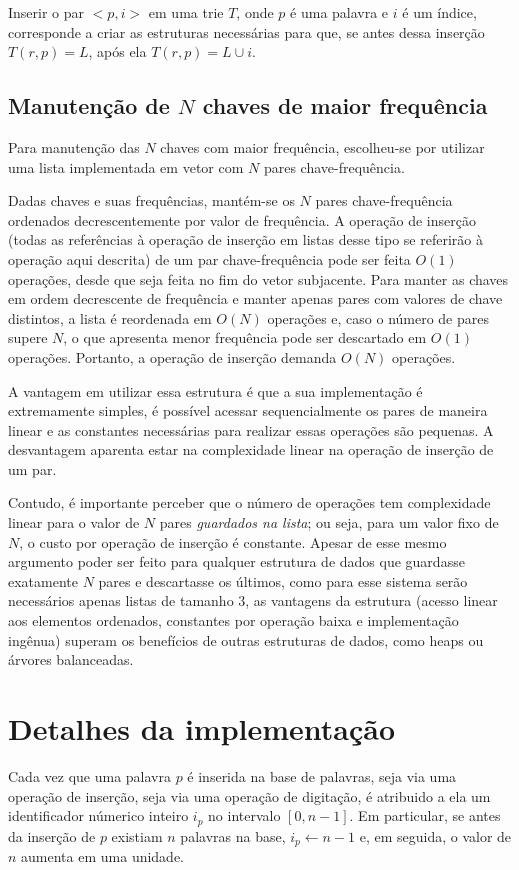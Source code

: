 \documentclass[12pt]{article}
\begin{document}
    Inserir o par $<p, i>$ em uma trie $T$, onde $p$ é uma palavra e $i$ é um índice, corresponde a criar as estruturas necessárias para que, se antes dessa inserção $T(r, p) = L$, após ela $T(r, p) = L \cup i$.

    \subsection{Manutenção de $N$ chaves de maior frequência} \label{sec:list}
    Para manutenção das $N$ chaves com maior frequência, escolheu-se por utilizar uma lista implementada em vetor com $N$ pares chave-frequência.

    Dadas chaves e suas fre\-quên\-cias, mantém-se os $N$ pares chave-frequência ordenados decrescentemente por valor de frequência.
    A operação de inserção (todas as referências à operação de inserção em listas desse tipo se referirão à operação aqui descrita) de um par chave-frequência pode ser feita $O(1)$ operações, desde que seja feita no fim do vetor subjacente.
    Para manter as chaves em ordem decrescente de frequência e manter apenas pares com valores de chave distintos, a lista é reordenada em $O(N)$ operações e, caso o número de pares supere $N$, o que apresenta menor frequência pode ser descartado em $O(1)$ operações.
    Portanto, a operação de inserção demanda $O(N)$ operações.

    A vantagem em utilizar essa estrutura é que a sua implementação é extremamente simples, é possível acessar sequencialmente os pares de maneira linear e as constantes necessárias para realizar essas operações são pequenas.
    A desvantagem aparenta estar na complexidade linear na operação de inserção de um par.

    Contudo, é importante perceber que o número de operações tem complexidade linear para o valor de $N$ pares \emph{guardados na lista}; ou seja, para um valor fixo de $N$, o custo por operação de inserção é constante.
    Apesar de esse mesmo argumento poder ser feito para qualquer estrutura de dados que guardasse exatamente $N$ pares e descartasse os últimos, como para esse sistema serão necessários apenas listas de tamanho 3, as vantagens da estrutura (acesso linear aos elementos ordenados, constantes por operação baixa e implementação ingênua) superam os benefícios de outras estruturas de dados, como heaps ou árvores balanceadas.

  \section{Detalhes da implementação}
    Cada vez que uma palavra $p$ é inserida na base de palavras, seja via uma operação de inserção, seja via uma operação de digitação, é atribuido a ela um identificador númerico inteiro $i_p$ no intervalo $[0, n - 1]$.
    Em particular, se antes da inserção de $p$ existiam $n$ palavras na base, $i_p \leftarrow n - 1$ e, em seguida, o valor de $n$ aumenta em uma unidade.
\end{document}
